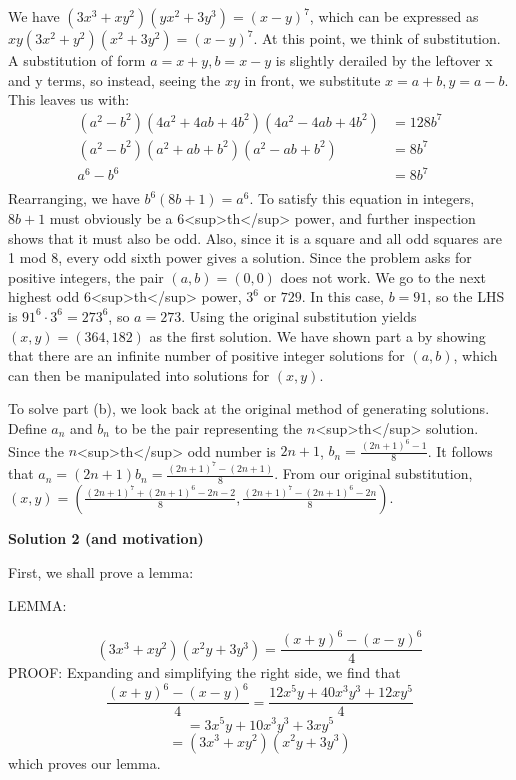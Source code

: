 \begin{enumerate}
We have $(3x^3+xy^2)(yx^2+3y^3)=(x-y)^7$, which can be expressed as $xy(3x^2+y^2)(x^2+3y^2)=(x-y)^7$. At this point, we think of substitution. A substitution of form $a=x+y, b=x-y$ is slightly derailed by the leftover x and y terms, so instead, seeing the $xy$ in front, we substitute $x=a+b, y=a-b$. This leaves us with:
 \begin{align*} (a^2-b^2)(4a^2+4ab+4b^2)(4a^2-4ab+4b^2)&=128b^7\\ (a^2-b^2)(a^2+ab+b^2)(a^2-ab+b^2)&=8b^7\\ a^6-b^6&=8b^7\\ \end{align*}
Rearranging, we have $b^6(8b+1)=a^6$. To satisfy this equation in integers, $8b+1$ must obviously be a $6$<sup>th</sup> power, and further inspection shows that it must also be odd. Also, since it is a square and all odd squares are 1 mod 8, every odd sixth power gives a solution. Since the problem asks for positive integers, the pair $(a,b)=(0,0)$ does not work. We go to the next highest odd $6$<sup>th</sup> power, $3^6$ or $729$. In this case, $b=91$, so the LHS is $91^6\cdot3^6=273^6$, so $a=273$. Using the original substitution yields $(x,y)=(364,182)$ as the first solution. We have shown part a by showing that there are an infinite number of positive integer solutions for $(a,b)$, which can then be manipulated into solutions for $(x,y)$.

 To solve part (b), we look back at the original method of generating solutions. Define $a_n$ and $b_n$ to be the pair representing the $n$<sup>th</sup> solution. Since the $n$<sup>th</sup> odd number is $2n+1$, $b_n=\frac{(2n+1)^6-1}{8}$. It follows that $a_n=(2n+1)b_n=\frac{(2n+1)^7-(2n+1)}{8}$. From our original substitution, $(x,y)=\left(\frac{(2n+1)^7+(2n+1)^6-2n-2}{8},\frac{(2n+1)^7-(2n+1)^6-2n}{8}\right)$.

 



\textbf{Solution 2 (and motivation)}

First, we shall prove a lemma:

 LEMMA:

 
 \[\left(3x^3 + xy^2 \right) \left(x^2y + 3y^3 \right) = \frac{(x+y)^6-(x-y)^6}{4}\]PROOF: Expanding and simplifying the right side, we find that 
 \[\frac{(x+y)^6-(x-y)^6}{4}=\frac{12x^5y+40x^3y^3+12xy^5}{4}\]
 \[=3x^5y+10x^3y^3+3xy^5\]
 \[=\left(3x^3 + xy^2 \right) \left(x^2y + 3y^3 \right)\]which proves our lemma.


\end{enumerate}
